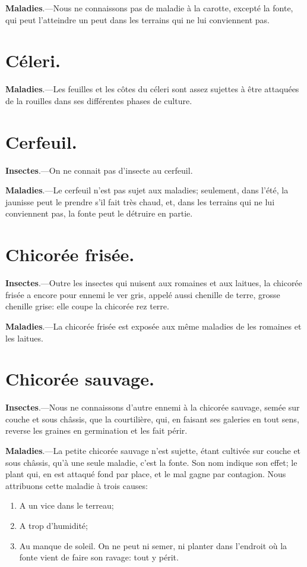 \documentclass[10pt,a4paper]{book}
\begin{document}
\textbf{Maladies}.---Nous ne connaissons pas de maladie à la carotte, excepté la fonte, qui peut l'atteindre un peut dans les terrains qui ne lui conviennent pas.

\section{Céleri.}

\textbf{Maladies}.---Les feuilles et les côtes du céleri sont assez sujettes à être attaquées de la rouilles dans ses différentes phases de culture.

\section{Cerfeuil.}

\textbf{Insectes}.---On ne connait pas d'insecte au cerfeuil.

\textbf{Maladies}.---Le cerfeuil n'est pas sujet aux maladies; seulement, dans l'été, la jaunisse peut le prendre s'il fait très chaud, et, dans les terrains qui ne lui conviennent pas, la fonte peut le détruire en partie.

\section{Chicorée frisée.}

\textbf{Insectes}.---Outre les insectes qui nuisent aux romaines et aux laitues, la chicorée frisée a encore pour ennemi le ver gris, appelé aussi chenille de terre, grosse chenille grise: elle coupe la chicorée rez terre.

\textbf{Maladies}.---La chicorée frisée est exposée aux même maladies de les romaines et les laitues.

\section{Chicorée sauvage.}

\textbf{Insectes}.---Nous ne connaissons d'autre ennemi à la chicorée sauvage, semée sur couche et sous châssis, que la courtilière, qui, en faisant ses galeries en tout sens, reverse les graines en germination et les fait périr.

\textbf{Maladies}.---La petite chicorée sauvage n'est sujette, étant cultivée sur couche et sous châssis, qu'à une seule maladie, c'est la fonte. Son nom indique son effet; le plant qui, en est attaqué fond par place, et le mal gagne par contagion. Nous attribuons cette maladie à trois causes:
\begin{enumerate}
\item A un vice dans le terreau;
\item A trop d'humidité;
\item Au manque de soleil. On ne peut ni semer, ni planter dans l'endroit où la fonte vient de faire son ravage: tout y périt.
\end{enumerate}
\end{document}
